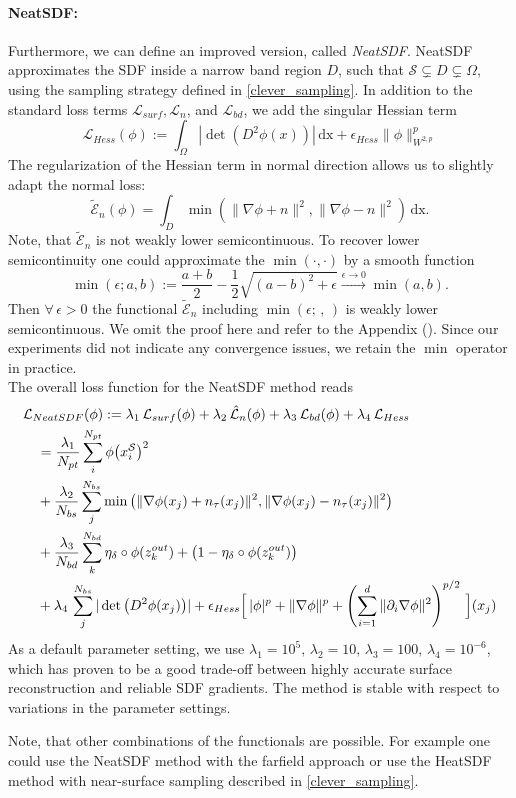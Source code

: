 \documentclass[12pt,openany]{book}
\def\S{\mathcal{S}}
\theoremstyle{plainnormal}
\theoremstyle{remark}
\begin{document}
\paragraph{NeatSDF:} Furthermore, we can define an improved version, called \emph{NeatSDF}. NeatSDF approximates the SDF inside a narrow band region $D$, such that $\S\subsetneq D\subsetneq\Omega$, using the sampling strategy defined in \cref{clever_sampling}. In addition to the standard loss terms $\mathcal{L}_{surf}, \mathcal L_{n}$, and $\mathcal{L}_{bd}$, we add the singular Hessian term 
$$ \mathcal L_{Hess}(\phi) := \int_\Omega |\det(D^2 \phi(x))| \,\mathrm{dx} + \epsilon_{Hess} \|\phi \|_{W^{2,p}}^p $$ The regularization of the Hessian term in normal direction allows us to slightly adapt the normal loss:
$$\tilde{\mathcal{E}}_{n}(\phi)= \int_D \min(\|\nabla \phi + n\|^2,\|\nabla \phi - n\|^2) \,\mathrm{dx}.$$
Note, that $\tilde{\mathcal{E}}_n$ is not weakly lower semicontinuous. To recover lower semicontinuity one could approximate the $\min(\cdot,\cdot)$ by a smooth function $$\min(\epsilon;a,b) := \frac{a + b}{2} - \frac{1}{2}\sqrt{(a-b)^2 + \epsilon} \xrightarrow[]{\epsilon \rightarrow0} \min(a,b).$$ Then $\forall\,\epsilon> 0$ the functional $\tilde {\mathcal E}_n$ including $\min(\epsilon; \,,\,)$ is weakly lower semicontinuous. We omit the proof here and refer to the Appendix (). Since our experiments did not indicate any convergence issues, we retain the $\min$ operator in practice.\\ 
The overall loss function for the NeatSDF method reads \begin{align}
    &\mathcal{L}_{NeatSDF}(\phi) := \lambda_1\, \mathcal{L}_{surf}(\phi) + \lambda _2\,\hat{\mathcal{L}}_{n}(\phi) + \lambda_3\,\mathcal{L}_{bd}(\phi) + \lambda_4\, \mathcal{L}_{Hess}\notag\\
    &\quad =\frac{\lambda_1}{N_{pt}}\sum_i^{N_{pt}}\phi\big( x_i^\S\big)^2
     \notag\\\notag & \quad + \frac{\lambda_2}{N_{bs}}\sum_j^{N_{bs}}
\min\big( \|\nabla \phi(x_j) + n_\tau(x_j)\|^2, \|\nabla \phi(x_j) - n_\tau(x_j)\|^2\big) \notag\\ & \quad+ \frac{\lambda_3}{N_{bd}} \sum_k^{N_{bd}} \eta_\delta\circ\phi(z_k^{out}) +\big(1-\eta_\delta\circ\phi(z_k^{out})\big)\notag\\
&\quad +\lambda_4\, \sum_j^{N_{bs}}|\det\big( D^2 \phi(x_j)\big)| + \epsilon_{Hess}\Big[\,|\phi|^p + \|\nabla \phi\|^p + \left( \sum_{i=1}^d \| \partial_i \nabla \phi \|^2 \right)^{p/2} \,\Big](x_j) 
\end{align} 
As a default parameter setting, we use $\lambda_ 1 = 10^5, \,\lambda_2 = 10, \,\lambda_3 = 100, \,\lambda_4 = 10^{-6}$, which has proven to be a good trade-off between highly accurate surface reconstruction and reliable SDF gradients. The method is stable with respect to variations in the parameter settings.\par
Note, that other combinations of the functionals are possible. For example one could use the NeatSDF method with the farfield approach or use the HeatSDF method with near-surface sampling described in \cref{clever_sampling}. 
\end{document}
